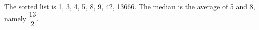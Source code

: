 The sorted list is 1, 3, 4, 5, 8, 9, 42, 13666. The median is the average of 5 and 8, namely $\boxed{\dfrac{13}{2}}$.
